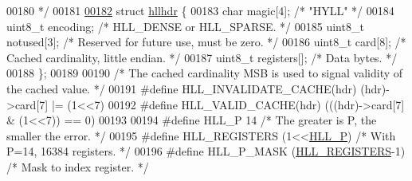 \begin{DoxyCode}
00180 \textcolor{comment}{ */}
00181 
\hyperlink{structhllhdr}{00182} \textcolor{keyword}{struct} \hyperlink{structhllhdr}{hllhdr} \{
00183     \textcolor{keywordtype}{char} magic[4];      \textcolor{comment}{/* "HYLL" */}
00184     uint8\_t encoding;   \textcolor{comment}{/* HLL\_DENSE or HLL\_SPARSE. */}
00185     uint8\_t notused[3]; \textcolor{comment}{/* Reserved for future use, must be zero. */}
00186     uint8\_t card[8];    \textcolor{comment}{/* Cached cardinality, little endian. */}
00187     uint8\_t registers[]; \textcolor{comment}{/* Data bytes. */}
00188 \};
00189 
00190 \textcolor{comment}{/* The cached cardinality MSB is used to signal validity of the cached value. */}
00191 \textcolor{preprocessor}{#}\textcolor{preprocessor}{define} \textcolor{preprocessor}{HLL\_INVALIDATE\_CACHE}\textcolor{preprocessor}{(}\textcolor{preprocessor}{hdr}\textcolor{preprocessor}{)} \textcolor{preprocessor}{(}\textcolor{preprocessor}{hdr}\textcolor{preprocessor}{)}\textcolor{preprocessor}{->}\textcolor{preprocessor}{card}\textcolor{preprocessor}{[}7\textcolor{preprocessor}{]} \textcolor{preprocessor}{|=} \textcolor{preprocessor}{(}1\textcolor{preprocessor}{<<}7\textcolor{preprocessor}{)}
00192 \textcolor{preprocessor}{#}\textcolor{preprocessor}{define} \textcolor{preprocessor}{HLL\_VALID\_CACHE}\textcolor{preprocessor}{(}\textcolor{preprocessor}{hdr}\textcolor{preprocessor}{)} \textcolor{preprocessor}{(}\textcolor{preprocessor}{(}\textcolor{preprocessor}{(}\textcolor{preprocessor}{hdr}\textcolor{preprocessor}{)}\textcolor{preprocessor}{->}\textcolor{preprocessor}{card}\textcolor{preprocessor}{[}7\textcolor{preprocessor}{]} \textcolor{preprocessor}{&} \textcolor{preprocessor}{(}1\textcolor{preprocessor}{<<}7\textcolor{preprocessor}{)}\textcolor{preprocessor}{)} \textcolor{preprocessor}{==} 0\textcolor{preprocessor}{)}
00193 
00194 \textcolor{preprocessor}{#}\textcolor{preprocessor}{define} \textcolor{preprocessor}{HLL\_P} 14 \textcolor{comment}{/* The greater is P, the smaller the error. */}
00195 \textcolor{preprocessor}{#}\textcolor{preprocessor}{define} \textcolor{preprocessor}{HLL\_REGISTERS} \textcolor{preprocessor}{(}1\textcolor{preprocessor}{<<}\hyperlink{hyperloglog_8c_a42896b243b4ffcf09e4457b6f174db9c}{HLL\_P}\textcolor{preprocessor}{)} \textcolor{comment}{/* With P=14, 16384 registers. */}
00196 \textcolor{preprocessor}{#}\textcolor{preprocessor}{define} \textcolor{preprocessor}{HLL\_P\_MASK} \textcolor{preprocessor}{(}\hyperlink{hyperloglog_8c_aa053beb90136828dcb46545c7445fc36}{HLL\_REGISTERS}\textcolor{preprocessor}{-}1\textcolor{preprocessor}{)} \textcolor{comment}{/* Mask to index register. */}

\end{DoxyCode}
